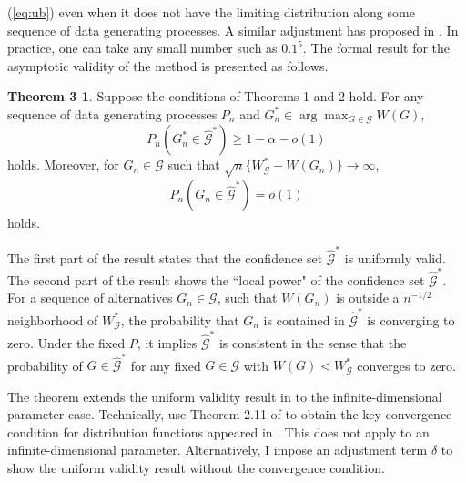 \documentclass[12pt,oneside,reqno,english]{amsart}
\theoremstyle{definition}
\newtheorem*{thm3}{Theorem 3}
\begin{document}
(\ref{eq:ub}) even when it does not have the limiting distribution along some sequence of data generating processes. 
A similar adjustment has proposed in \cite{AS:13}.
In practice, one can take any small number such as $0.1^{5}$. 
The formal result for the asymptotic validity of the method is presented as follows. 
\begin{thm3} 
Suppose the conditions of Theorems 1 and 2 hold. 
For any sequence of data generating processes $P_{n}$ and $G^{*}_{n}\in \arg\max_{G\in \mathcal{G}}W(G)$,
\[P_{n}(G^{*}_{n}\in \hat{\mathcal{G}}^{*})\geq 1-\alpha-o(1)\]
holds. Moreover, for $G_{n}\in \mathcal{G}$ such that $\sqrt{n}\{W^{*}_{\mathcal{G}}-W(G_{n})\}\rightarrow \infty$,  
\begin{align*}
P_{n}(G_{n}\in \hat{\mathcal{G}}^{*})= o(1)
\end{align*}
holds.
\end{thm3}
The first part of the result states that the confidence set $\hat{\mathcal{G}}^{*}$ is uniformly valid. 
The second part of the result shows the ``local power" of the confidence set $\hat{\mathcal{G}}^{*}$. For a sequence of alternatives $G_{n}\in \mathcal{G}$, such that $W(G_{n})$ is outside a $n^{-1/2}$ neighborhood of $W_{\mathcal{G}}^{*}$, the probability that $G_{n}$ is contained in $\hat{\mathcal{G}}^{*}$ is converging to zero. Under the fixed $P$, it implies $\hat{\mathcal{G}}^{*}$ is consistent in the sense that 
the probability of $G\in \hat{\mathcal{G}}^{*}$ for any fixed $G\in \mathcal{G}$ with $W(G)<W^{*}_{\mathcal{G}}$ converges to zero. 

The theorem extends the uniform validity result in \cite{HL:18} to the infinite-dimensional parameter case.
Technically, \cite{HL:18} use Theorem 2.11 of \cite{BR:76}
to obtain the key convergence condition for distribution functions appeared in \cite{RS:12}. 
This does not apply to an infinite-dimensional parameter. Alternatively, I impose an adjustment term $\delta$ to show the uniform validity result without the convergence condition.  
\end{document}
